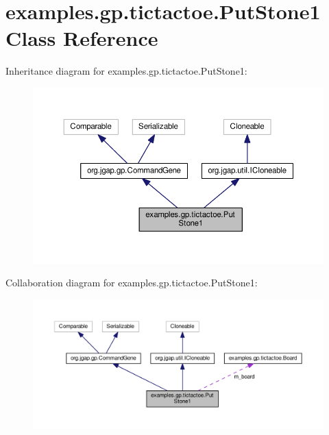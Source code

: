 \hypertarget{classexamples_1_1gp_1_1tictactoe_1_1_put_stone1}{\section{examples.\-gp.\-tictactoe.\-Put\-Stone1 Class Reference}
\label{classexamples_1_1gp_1_1tictactoe_1_1_put_stone1}
}


Inheritance diagram for examples.\-gp.\-tictactoe.\-Put\-Stone1\-:
\nopagebreak
\begin{figure}[H]
\begin{center}
\leavevmode
\includegraphics[width=350pt]{classexamples_1_1gp_1_1tictactoe_1_1_put_stone1__inherit__graph}
\end{center}
\end{figure}


Collaboration diagram for examples.\-gp.\-tictactoe.\-Put\-Stone1\-:
\nopagebreak
\begin{figure}[H]
\begin{center}
\leavevmode
\includegraphics[width=350pt]{classexamples_1_1gp_1_1tictactoe_1_1_put_stone1__coll__graph}
\end{center}
\end{figure}
